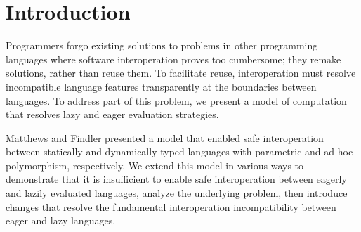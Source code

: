 \section{Introduction}

Programmers forgo existing solutions to problems in other programming languages where software interoperation proves too cumbersome; they remake solutions, rather than reuse them. To facilitate reuse, interoperation must resolve incompatible language features transparently at the boundaries between languages. To address part of this problem, we present a model of computation that resolves lazy and eager evaluation strategies.

Matthews and Findler presented \cite{matthews07} a model that enabled safe interoperation between statically and dynamically typed languages with parametric and ad-hoc polymorphism, respectively. We extend this model in various ways to demonstrate that it is insufficient to enable safe interoperation between eagerly and lazily evaluated languages, analyze the underlying problem, then introduce changes that resolve the fundamental interoperation incompatibility between eager and lazy languages.
